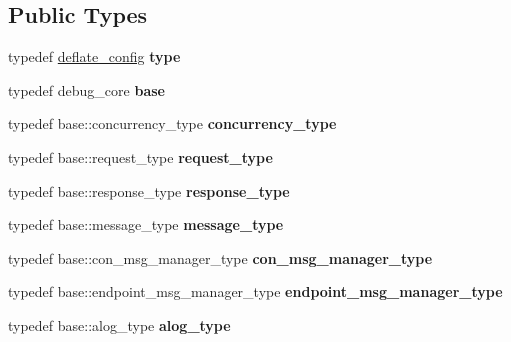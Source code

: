 \subsection*{Public Types}
\begin{DoxyCompactItemize}
\item 
\mbox{\label{structdeflate__config_ae5de21f2afdd167fdf3642d312730044}} 
typedef \mbox{\hyperlink{structdeflate__config}{deflate\+\_\+config}} {\bfseries type}
\item 
\mbox{\label{structdeflate__config_a636b749140c863697789ee1f0ee8a93c}} 
typedef debug\+\_\+core {\bfseries base}
\item 
\mbox{\label{structdeflate__config_a102a1217cfcc29b0fdbce3274f24f1f0}} 
typedef base\+::concurrency\+\_\+type {\bfseries concurrency\+\_\+type}
\item 
\mbox{\label{structdeflate__config_a9e3ad39bfeac4d3019ec11a258cc7e97}} 
typedef base\+::request\+\_\+type {\bfseries request\+\_\+type}
\item 
\mbox{\label{structdeflate__config_aa833af0fcc5ecab6384efddb10ba2973}} 
typedef base\+::response\+\_\+type {\bfseries response\+\_\+type}
\item 
\mbox{\label{structdeflate__config_ad09daf755c798d68e4165b26f5666c1b}} 
typedef base\+::message\+\_\+type {\bfseries message\+\_\+type}
\item 
\mbox{\label{structdeflate__config_a53ac00e73a66a9ac4d2ad1f35fdcc1e0}} 
typedef base\+::con\+\_\+msg\+\_\+manager\+\_\+type {\bfseries con\+\_\+msg\+\_\+manager\+\_\+type}
\item 
\mbox{\label{structdeflate__config_a7dc7b396942bf1257a1150e0f116b6f3}} 
typedef base\+::endpoint\+\_\+msg\+\_\+manager\+\_\+type {\bfseries endpoint\+\_\+msg\+\_\+manager\+\_\+type}
\item 
\mbox{\label{structdeflate__config_a8d100281307805500bfa56cbb31f40a2}} 
typedef base\+::alog\+\_\+type {\bfseries alog\+\_\+type}

\end{DoxyCompactItemize}
